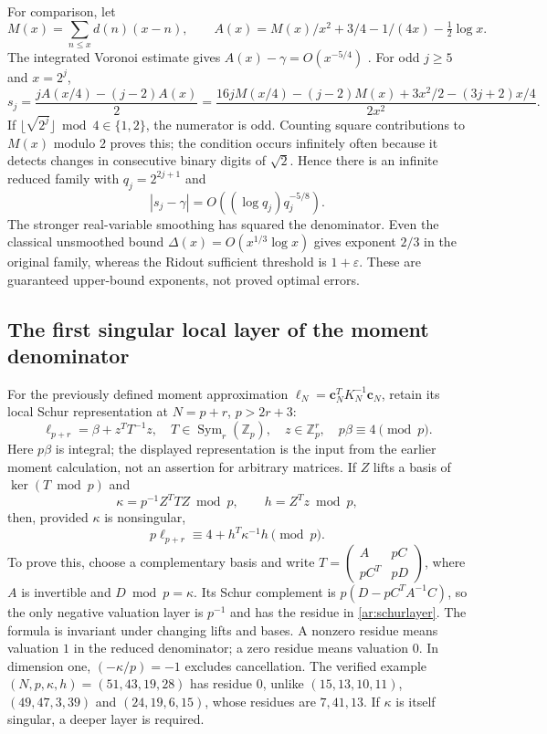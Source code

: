 \documentclass[11pt,a4paper]{article}
\newcommand{\Z}{\mathbb Z}
\theoremstyle{definition}
\theoremstyle{remark}
\numberwithin{equation}{section}
\begin{document}
For comparison, let
\[
 M(x)=\sum_{n\le x}d(n)(x-n),\qquad
 A(x)=M(x)/x^2+3/4-1/(4x)-\tfrac12\log x.
\]
The integrated Voronoi estimate gives $A(x)-\gamma=O(x^{-5/4})$
\cite{ar:Ivic}.  For odd $j\ge5$ and $x=2^j$,
\[
 s_j=\frac{jA(x/4)-(j-2)A(x)}2
 =\frac{16jM(x/4)-(j-2)M(x)+3x^2/2-(3j+2)x/4}{2x^2}.
\]
If $\lfloor\sqrt{2^j}\rfloor\bmod4\in\{1,2\}$, the numerator is odd.
Counting square contributions to $M(x)$ modulo $2$ proves this; the
condition occurs infinitely often because it detects changes in consecutive
binary digits of $\sqrt2$.  Hence there is an infinite reduced family with
$q_j=2^{2j+1}$ and
\[
 |s_j-\gamma|=O((\log q_j)q_j^{-5/8}).
\]
The stronger real-variable smoothing has squared the denominator.  Even
the classical unsmoothed bound $\Delta(x)=O(x^{1/3}\log x)$ gives exponent
$2/3$ in the original family, whereas the Ridout sufficient threshold is
$1+\varepsilon$.  These are guaranteed upper-bound exponents, not proved
optimal errors.

\subsection{The first singular local layer of the moment denominator}
\label{ar:localmoment}
For the previously defined moment approximation
$\ell_N=\boldsymbol c_N^TK_N^{-1}\boldsymbol c_N$, retain its local
Schur representation at $N=p+r$, $p>2r+3$:
\[
 \ell_{p+r}=\beta+z^TT^{-1}z,\quad
 T\in\operatorname{Sym}_r(\Z_p),\quad z\in\Z_p^r,\quad
 p\beta\equiv4\pmod p.
\]
Here $p\beta$ is integral; the displayed representation is the input from
the earlier moment calculation, not an assertion for arbitrary matrices.
If $Z$ lifts a basis of $\ker(T\bmod p)$ and
\[
 \kappa=p^{-1}Z^TTZ\bmod p,\qquad h=Z^Tz\bmod p,
\]
then, provided $\kappa$ is nonsingular,
\begin{equation}\label{ar:schurlayer}
 p\ell_{p+r}\equiv4+h^T\kappa^{-1}h\pmod p.
\end{equation}
To prove this, choose a complementary basis and write
$T=\left(\begin{smallmatrix}A&pC\\pC^T&pD\end{smallmatrix}\right)$,
where $A$ is invertible and $D\bmod p=\kappa$.  Its Schur complement is
$p(D-pC^TA^{-1}C)$, so the only negative valuation layer is $p^{-1}$ and
has the residue in \eqref{ar:schurlayer}.  The formula is invariant under
changing lifts and bases.  A nonzero residue means valuation $1$ in the
reduced denominator; a zero residue means valuation $0$.  In dimension
one, $(-\kappa/p)=-1$ excludes cancellation.  The verified example
$(N,p,\kappa,h)=(51,43,19,28)$ has residue $0$, unlike
$(15,13,10,11)$, $(49,47,3,39)$ and $(24,19,6,15)$, whose residues are
$7,41,13$.  If $\kappa$ is itself singular, a deeper layer is required.
\end{document}
